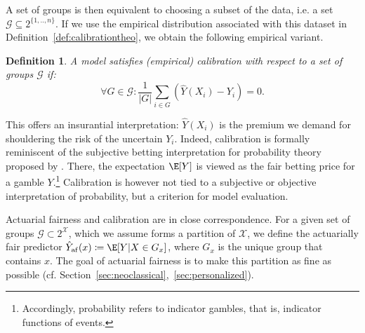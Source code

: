 \documentclass[11pt]{article} %
\makeatletter
\newcommand*{\ie}{i.e.\@\xspace}
\newcommand*{\cf}{cf.\@\xspace}
\newcommand{\actfairpred}{\hat{Y}_{\mathrm{af}}}
\newtheorem{definition}[theorem]{Definition}
\makeatother
\begin{document}
A set of groups is then equivalent to choosing a subset of the data, \ie a set $\mathcal{G} \subseteq 2^{\{1,..,n\}}$.
If we use the empirical distribution associated with this dataset in Definition~\ref{def:calibrationtheo}, we obtain the following empirical variant.
\begin{definition}
\label{def:generalcalibration}
    A model satisfies (empirical) calibration with respect to a set of groups $\mathcal{G}$ if:
    \begin{displaymath}
         \forall G \in \mathcal{G}: \frac{1}{|G|} \sum_{i \in G} (\hat{Y}(X_i) - Y_i) = 0.
    \end{displaymath}
\end{definition}
This offers an insurantial interpretation: $\hat{Y}(X_i)$ is the premium we demand for shouldering the risk of the uncertain $Y_i$. Indeed, calibration is formally reminiscent of the subjective betting interpretation for probability theory proposed by \citet{de2017theory}.
There, the expectation $\E[Y]$ is viewed as the fair betting price for a gamble $Y$.\footnote{Accordingly, probability refers to indicator gambles, that is, indicator functions of events.} Calibration is however not tied to a subjective or objective interpretation of probability, but a criterion for model evaluation.

Actuarial fairness and calibration are in close correspondence. For a given set of groups $\mathcal{G} \subset 2^{\mathcal{X}}$, which we assume forms a partition of $\mathcal{X}$, we define the actuarially fair predictor $\actfairpred(x) \coloneqq \E[Y|X \in G_x]$, where $G_x$ is the unique group that contains $x$. The goal of actuarial fairness is to make this partition as fine as possible (\cf Section~\ref{sec:neoclassical},~\ref{sec:personalized}).
\end{document}
